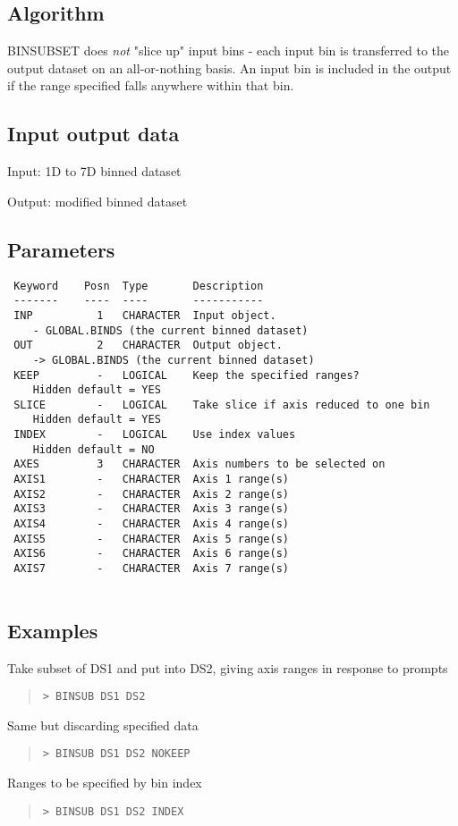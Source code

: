 \documentclass{book}
\renewcommand{\_}{{\tt\char'137}}     %
\begin{document}
\subsection{Algorithm}
BINSUBSET does {\em not} "slice up" input bins - each input bin is
transferred to the output dataset on an all-or-nothing basis.
An input bin is included in the output if the range specified
falls anywhere within that bin.
 
\subsection{Input output data}
Input: 1D to 7D binned dataset
 
Output: modified binned dataset
 
\subsection{Parameters}
\begin{verbatim}
 Keyword    Posn  Type       Description
 -------    ----  ----       -----------
 INP          1   CHARACTER  Input object.
    - GLOBAL.BINDS (the current binned dataset)
 OUT          2   CHARACTER  Output object.
    -> GLOBAL.BINDS (the current binned dataset)
 KEEP         -   LOGICAL    Keep the specified ranges?
    Hidden default = YES
 SLICE        -   LOGICAL    Take slice if axis reduced to one bin
    Hidden default = YES
 INDEX        -   LOGICAL    Use index values
    Hidden default = NO
 AXES         3   CHARACTER  Axis numbers to be selected on
 AXIS1        -   CHARACTER  Axis 1 range(s)
 AXIS2        -   CHARACTER  Axis 2 range(s)
 AXIS3        -   CHARACTER  Axis 3 range(s)
 AXIS4        -   CHARACTER  Axis 4 range(s)
 AXIS5        -   CHARACTER  Axis 5 range(s)
 AXIS6        -   CHARACTER  Axis 6 range(s)
 AXIS7        -   CHARACTER  Axis 7 range(s)
 
\end{verbatim}\subsection{Examples}
Take subset of DS1 and put into DS2, giving axis ranges in response
to prompts
\begin{quote}\begin{verbatim}
> BINSUB DS1 DS2
\end{verbatim}\end{quote}
Same but discarding specified data
\begin{quote}\begin{verbatim}
> BINSUB DS1 DS2 NOKEEP
\end{verbatim}\end{quote}
Ranges to be specified by bin index
\begin{quote}\begin{verbatim}
> BINSUB DS1 DS2 INDEX
\end{verbatim}\end{quote}
\end{document}
